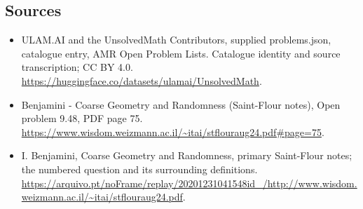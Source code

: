 \documentclass[11pt,a4paper]{article}
\begin{document}
\subsection{Sources}
\begin{itemize}
\item[S1] ULAM.AI and the UnsolvedMath Contributors, supplied problems.json, catalogue entry, AMR Open Problem Lists. Catalogue identity and source transcription; CC BY 4.0.
\url{https://huggingface.co/datasets/ulamai/UnsolvedMath}.
\item[S2] Benjamini - Coarse Geometry and Randomness (Saint-Flour notes), Open problem 9.48, PDF page 75. 
\url{https://www.wisdom.weizmann.ac.il/~itai/stflouraug24.pdf#page=75}.
\item[S3] I. Benjamini, Coarse Geometry and Randomness, primary Saint-Flour notes; the numbered question and its surrounding definitions.
\url{https://arquivo.pt/noFrame/replay/20201231041548id_/http://www.wisdom.weizmann.ac.il/~itai/stflouraug24.pdf}.
\end{itemize}
\end{document}
